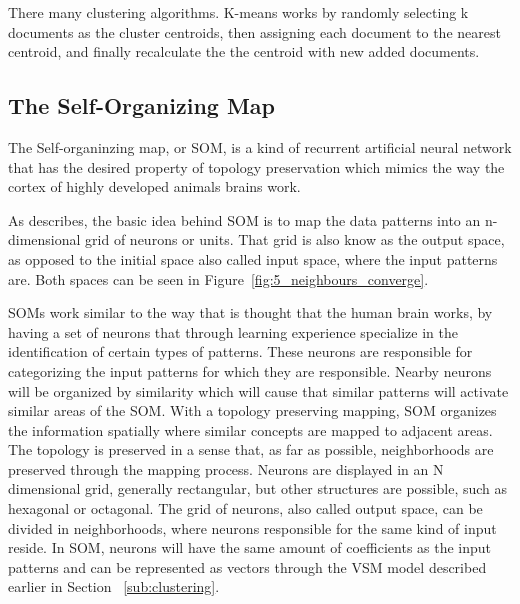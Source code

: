 There many clustering algorithms. K-means works by randomly selecting k documents as the cluster centroids, then assigning each document to the nearest centroid, and finally recalculate the the centroid with new added documents. 

\subsection{The Self-Organizing Map} 
\label{sub:the_self_organizing_map}

The Self-organinzing map, or SOM, is a kind of recurrent artificial neural network that has the desired property of topology preservation which mimics the way the cortex of highly developed animals brains work.

As \citet{Bacao2005} describes, the basic idea behind SOM is to map the data patterns into an n-dimensional grid of neurons or units. That grid is also know as the output space, as opposed to the initial space also called input space, where the input patterns are. Both spaces can be seen in Figure~\ref{fig:5_neighbours_converge}.

SOMs work similar to the way that is thought that the human brain works, by having a set of neurons that through learning experience specialize in the identification of certain types of patterns. These neurons are responsible for categorizing the input patterns for which they are responsible. Nearby neurons will be organized by similarity which will cause that similar patterns will activate similar areas of the SOM.
With a topology preserving mapping, SOM organizes the information spatially where similar concepts are mapped to adjacent areas. The topology is preserved in a sense that, as far as possible, neighborhoods are preserved through the mapping process.
Neurons are displayed in an N dimensional grid, generally rectangular, but other structures are possible, such as hexagonal or octagonal.  The grid of neurons, also called output space, can be divided in neighborhoods, where neurons responsible for the same kind of input reside.
In SOM, neurons will have the same amount of coefficients as the input patterns and can be represented as vectors through the VSM model described earlier in Section ~\ref{sub:clustering}.

